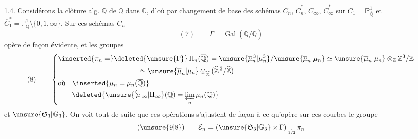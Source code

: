 1.4. Considérons la clôture alg. $\overline{\mathbb Q}$ de $\mathbb Q$ dans $\mathbb C$,
d'où par changement de base des schémas $\overline C_n$, $\overline C_n^*$,
$\overline C_\infty$, $\overline C_\infty^*$ sur $\overline C_1=\mathbb P^1_{\overline{\mathbb Q}}$
et $\overline C_1^*=\mathbb P^1_{\overline{\mathbb Q}}\setminus\{0,1,\infty\}$.
Sur ces schémas $C_n$
\[
(7)\qquad\Gamma=\operatorname{Gal}(\overline{\mathbb Q}/\mathbb Q)
\]
opère de façon évidente, et  les groupes
\[
(8)\qquad\left\{\begin{aligned}
&\inserted{\pi_n=}\deleted{\unsure{\Gamma}}\,
\Pi_n(\overline{\mathbb Q})=
\unsure{\overline\mu_n^{\,3}|\mu_n^3}/\unsure{\overline\mu_n|\mu_n}
\simeq\unsure{\overline\mu_n|\mu_n}\otimes_{\mathbb Z}\mathbb Z^3/\mathbb Z\\
&\hspace{4cm}\simeq\unsure{\overline\mu_n|\mu_n}\otimes_{\widehat{\mathbb Z}}
(\widehat{\mathbb Z}^{\,3}/\widehat{\mathbb Z})\\
&\text{où}\quad\inserted{\mu_n=\mu_n(\overline{\mathbb Q})}\\
&\qquad\deleted{\unsure{\overleftarrow\mu_\infty|\Pi_\infty}(\overline{\mathbb Q})=
\varprojlim_n\mu_n(\overline{\mathbb Q})}
\end{aligned}\right.
\]
et $\unsure{\mathfrak S_3|\mathbb G_3}$. On voit tout de suite que ces opérations
s'ajustent de façon à ce qu'opère sur ces courbes le groupe
\[
(\unsure{9|8})\qquad\mathcal E_n=
(\unsure{\mathfrak S_3|\mathbb G_3}\times\Gamma)
\mathbin{\underset{\scriptscriptstyle 1/2}{.}}\pi_n
\]

